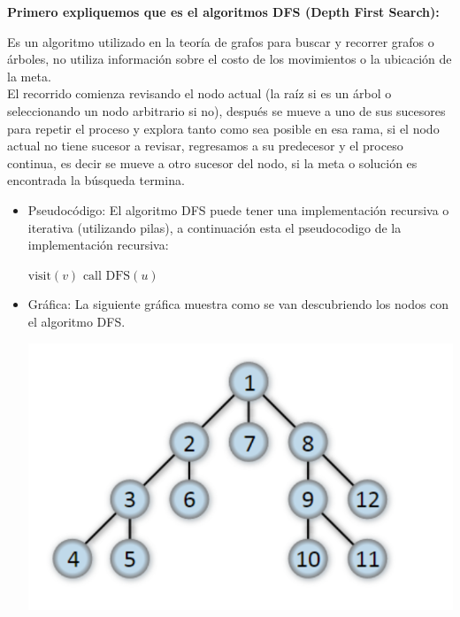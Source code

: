 \noindent \textbf{\large{Primero expliquemos que es el algoritmos DFS (Depth First Search):}}

Es un algoritmo utilizado en la teoría de grafos para buscar y recorrer grafos o árboles, 
no utiliza información sobre el costo de los movimientos o la ubicación de la meta.\\


El recorrido comienza revisando el nodo actual (la raíz si es un árbol o seleccionando un 
nodo arbitrario si no), después se mueve a uno de sus sucesores para repetir el proceso y 
explora tanto como sea posible en esa rama, si el nodo actual no tiene sucesor a revisar, 
regresamos a su predecesor y el proceso continua, es decir se mueve a otro sucesor del nodo, 
si la meta o solución es encontrada la búsqueda termina.

\begin{itemize}
    \item Pseudocódigo: El algoritmo DFS puede tener una implementación recursiva o iterativa 
    (utilizando pilas), a continuación esta el pseudocodigo de la implementación recursiva:
    \begin{center}
        \begin{algorithmic}[1]
            \State $\text{visit}(v)$
                    \State $\text{call DFS}(u)$
                \EndIf
            \EndFor
            \EndProcedure
        \end{algorithmic}
    \end{center}

    \item Gráfica: La siguiente gráfica muestra como se van descubriendo los nodos con el algoritmo DFS.

    \begin{center}
        \includegraphics[scale = 0.5]{IMA/ejemploDFS.png}
    \end{center}


\end{itemize}
